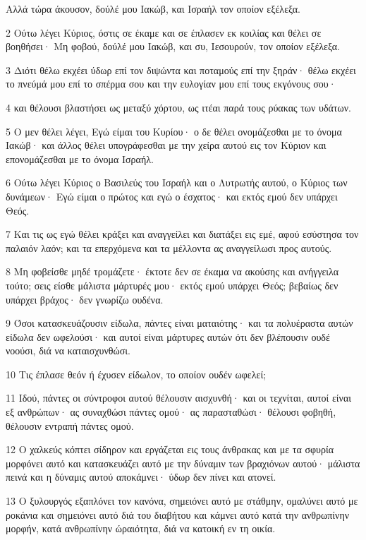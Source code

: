 \par Αλλά τώρα άκουσον, δούλέ μου Ιακώβ, και Ισραήλ τον οποίον εξέλεξα.
\par 2 Ούτω λέγει Κύριος, όστις σε έκαμε και σε έπλασεν εκ κοιλίας και θέλει σε βοηθήσει· Μη φοβού, δούλέ μου Ιακώβ, και συ, Ιεσουρούν, τον οποίον εξέλεξα.
\par 3 Διότι θέλω εκχέει ύδωρ επί τον διψώντα και ποταμούς επί την ξηράν· θέλω εκχέει το πνεύμά μου επί το σπέρμα σου και την ευλογίαν μου επί τους εκγόνους σου·
\par 4 και θέλουσι βλαστήσει ως μεταξύ χόρτου, ως ιτέαι παρά τους ρύακας των υδάτων.
\par 5 Ο μεν θέλει λέγει, Εγώ είμαι του Κυρίου· ο δε θέλει ονομάζεσθαι με το όνομα Ιακώβ· και άλλος θέλει υπογράφεσθαι με την χείρα αυτού εις τον Κύριον και επονομάζεσθαι με το όνομα Ισραήλ.
\par 6 Ούτω λέγει Κύριος ο Βασιλεύς του Ισραήλ και ο Λυτρωτής αυτού, ο Κύριος των δυνάμεων· Εγώ είμαι ο πρώτος και εγώ ο έσχατος· και εκτός εμού δεν υπάρχει Θεός.
\par 7 Και τις ως εγώ θέλει κράξει και αναγγείλει και διατάξει εις εμέ, αφού εσύστησα τον παλαιόν λαόν; και τα επερχόμενα και τα μέλλοντα ας αναγγείλωσι προς αυτούς.
\par 8 Μη φοβείσθε μηδέ τρομάζετε· έκτοτε δεν σε έκαμα να ακούσης και ανήγγειλα τούτο; σεις είσθε μάλιστα μάρτυρές μου· εκτός εμού υπάρχει Θεός; βεβαίως δεν υπάρχει βράχος· δεν γνωρίζω ουδένα.
\par 9 Όσοι κατασκευάζουσιν είδωλα, πάντες είναι ματαιότης· και τα πολυέραστα αυτών είδωλα δεν ωφελούσι· και αυτοί είναι μάρτυρες αυτών ότι δεν βλέπουσιν ουδέ νοούσι, διά να καταισχυνθώσι.
\par 10 Τις έπλασε θεόν ή έχυσεν είδωλον, το οποίον ουδέν ωφελεί;
\par 11 Ιδού, πάντες οι σύντροφοι αυτού θέλουσιν αισχυνθή· και οι τεχνίται, αυτοί είναι εξ ανθρώπων· ας συναχθώσι πάντες ομού· ας παρασταθώσι· θέλουσι φοβηθή, θέλουσιν εντραπή πάντες ομού.
\par 12 Ο χαλκεύς κόπτει σίδηρον και εργάζεται εις τους άνθρακας και με τα σφυρία μορφόνει αυτό και κατασκευάζει αυτό με την δύναμιν των βραχιόνων αυτού· μάλιστα πεινά και η δύναμις αυτού αποκάμνει· ύδωρ δεν πίνει και ατονεί.
\par 13 Ο ξυλουργός εξαπλόνει τον κανόνα, σημειόνει αυτό με στάθμην, ομαλύνει αυτό με ροκάνια και σημειόνει αυτό διά του διαβήτου και κάμνει αυτό κατά την ανθρωπίνην μορφήν, κατά ανθρωπίνην ώραιότητα, διά να κατοική εν τη οικία.
